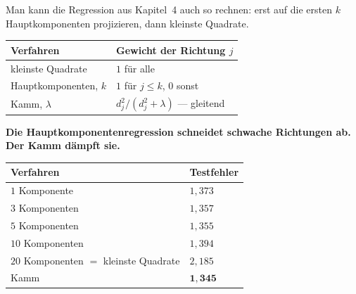 \begin{merksatz}
Man kann die Regression aus Kapitel~4 auch so rechnen: erst auf die ersten $k$ Hauptkomponenten projizieren, dann kleinste Quadrate.

\begin{center}
{\small
\renewcommand{\arraystretch}{1.55}
\begin{tabular}{@{}P{3.6cm}P{5.0cm}@{}}
\toprule
\textbf{Verfahren} & \textbf{Gewicht der Richtung $j$}\\
\midrule
kleinste Quadrate & $1$ für alle\\
Hauptkomponenten, $k$ & $1$ für $j \le k$, $0$ sonst\\
Kamm, $\lambda$ & $d_j^{2}/(d_j^{2}+\lambda)$ --- gleitend\\
\bottomrule
\end{tabular}}
\end{center}

\begin{center}
\begin{minipage}{0.9\textwidth}
\textbf{Die Hauptkomponentenregression schneidet schwache Richtungen ab. Der Kamm dämpft sie.}
\end{minipage}
\end{center}

\begin{center}
{\small
\renewcommand{\arraystretch}{1.46}
\begin{tabular}{@{}P{3.4cm}P{2.4cm}@{}}
\toprule
\textbf{Verfahren} & \textbf{Testfehler}\\
\midrule
$1$ Komponente & $1{,}373$\\
$3$ Komponenten & $1{,}357$\\
$5$ Komponenten & $1{,}355$\\
$10$ Komponenten & $1{,}394$\\
$20$ Komponenten $=$ kleinste Quadrate & $2{,}185$\\
\midrule
Kamm & $\mathbf{1{,}345}$\\
\bottomrule
\end{tabular}}
\end{center}

\begin{center}
\begin{minipage}{0.88\textwidth}
\end{minipage}
\end{center}
\end{merksatz}

